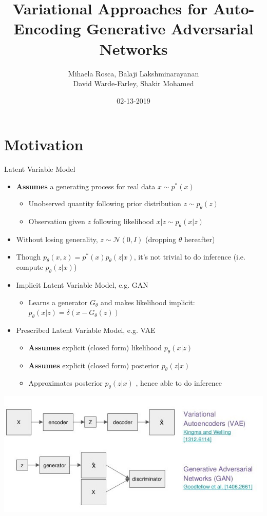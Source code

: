 \documentclass[compress]{beamer}
\title{Variational Approaches for Auto-Encoding Generative Adversarial Networks}
\author[Presentor: Shih-Ming Wang]{Mihaela Rosca, Balaji Lakshminarayanan \\ David Warde-Farley, Shakir Mohamed}
\institute[]{Presented by Shih-Ming Wang \\ ComputerVision Lab, UCSC}
\date{02-13-2019}
\begin{document}
\begin{frame}
    \maketitle
    \hypertarget{titlePage}{}
\end{frame}

\section{Motivation}
\begin{frame}[allowframebreaks]{Latent Variable Model}
    \begin{itemize}
        \item \textbf{Assumes} a generating process for real data $x\sim p^*(x)$
            \begin{itemize}
                \item Unobserved quantity following prior distribution $z\sim p_\theta(z)$
                \item Observation given $z$ following likelihood $x|z\sim p_{\theta}(x|z)$
            \end{itemize}
        \item Without losing generality, $z\sim \mathcal{N}(0, I)$ (dropping $\theta$ hereafter)
        \item Though $p_{\theta}(x,z)=p^*(x)p_{\theta}(z|x)$, it's not trivial to do inference (i.e. compute $p_{\theta}(z|x)$)
        \item Implicit Latent Variable Model, e.g. GAN
            \begin{itemize}
                \item Learns a generator $G_{\theta}$ and makes likelihood implicit: $p_{\theta}(x|z)= \delta(x-G_{\theta}(z))$
            \end{itemize}
        \item Prescribed Latent Variable Model, e.g. VAE
            \begin{itemize}
                \item \textbf{Assumes} explicit (closed form) likelihood $p_{\theta}(x|z)$
                \item \textbf{Assumes} explicit (closed form) posterior $p_{\theta}(z|x)$
                \item Approximates posterior $p_{\theta}(z|x)$ , hence able to do inference
            \end{itemize}
    \end{itemize} 
    \framebreak
    \includegraphics[height=.8\textheight,width=\textwidth]{vaeandgan}

\end{frame}
\end{document}
